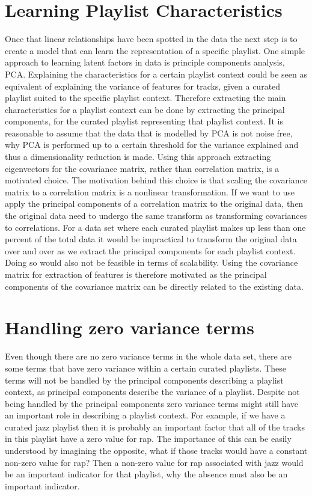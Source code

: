 \documentclass[a4paper,11pt]{kth-mag}
\begin{document}
\section{Learning Playlist Characteristics}

Once that linear relationships have been spotted in the data the next step is to create a model that can learn the representation of a specific playlist. One simple approach to learning latent factors in data is principle components analysis, PCA.
Explaining the characteristics for a certain playlist context could be seen as equivalent of explaining the variance of features for tracks, given a curated playlist suited to the specific playlist context. Therefore extracting the main characteristics for a playlist context can be done by extracting the principal components, for the curated playlist representing that playlist context. It is reasonable to assume that the data that is modelled by PCA is not noise free, why PCA is performed up to a certain threshold for the variance explained and thus a dimensionality reduction is made. 
Using this approach extracting eigenvectors for the covariance matrix, rather than correlation matrix, is a motivated choice. The motivation behind this choice is that scaling the covariance matrix to a correlation matrix is a nonlinear transformation. If we want to use apply the principal components of a correlation matrix to the original data, then the original data need to undergo the same transform as transforming covariances to correlations. For a data set where each curated playlist makes up less than one percent of the total data it would be impractical to transform the original data over and over as we extract the principal components for each playlist context. Doing so would also not be feasible in terms of scalability. Using the covariance matrix for extraction of features is therefore motivated as the principal components of the covariance matrix can be directly related to the existing data.

\section{Handling zero variance terms}
Even though there are no zero variance terms in the whole data set, there are some terms that have zero variance within a certain curated playlists. These terms will not be handled by the principal components describing a playlist context, as principal components describe the variance of a playlist. Despite not being handled by the principal components zero variance terms might still have an important role in describing a playlist context. For example, if we have a curated jazz playlist then it is probably an important factor that all of the tracks in this playlist have a zero value for rap. The importance of this can be easily understood by imagining the opposite, what if those tracks would have a constant non-zero value for rap? Then a non-zero value for rap associated with jazz would be an important indicator for that playlist, why the absence must also be an important indicator.
\end{document}
